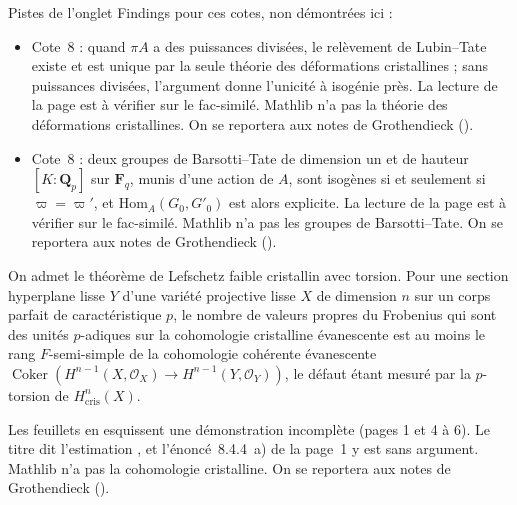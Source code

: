 \noindent Pistes de l'onglet Findings pour ces cotes, non démontrées ici :
\begin{itemize}\small\setlength{\itemsep}{0pt}
\item Cote~8 : quand $\pi A$ a des puissances divisées, le relèvement de Lubin--Tate existe et est unique par la seule théorie des déformations cristallines ; sans puissances divisées, l'argument donne l'unicité à isogénie près. La lecture de la page est à vérifier sur le fac-similé. Mathlib n'a pas la théorie des déformations cristallines. On se reportera aux notes de Grothendieck ().
\item Cote~8 : deux groupes de Barsotti--Tate de dimension un et de hauteur $[K : \mathbf Q_p]$ sur $\mathbf F_q$, munis d'une action de $A$, sont isogènes si et seulement si $\varpi = \varpi'$, et $\mathrm{Hom}_A(G_0, G'_0)$ est alors explicite. La lecture de la page est à vérifier sur le fac-similé. Mathlib n'a pas les groupes de Barsotti--Tate. On se reportera aux notes de Grothendieck ().
\end{itemize}

\begin{encadre}
\begin{theoreme*}\nonverifie
On admet le théorème de Lefschetz faible cristallin avec torsion. Pour une section hyperplane lisse $Y$ d'une variété projective lisse $X$ de dimension $n$ sur un corps parfait de caractéristique $p$, le nombre de valeurs propres du Frobenius qui sont des unités $p$-adiques sur la cohomologie cristalline évanescente est au moins le rang $F$-semi-simple de la cohomologie cohérente évanescente $\operatorname{Coker}(H^{n-1}(X, \mathcal O_X) \to H^{n-1}(Y, \mathcal O_Y))$, le défaut étant mesuré par la $p$-torsion de $H^n_{\mathrm{cris}}(X)$.
\end{theoreme*}
\end{encadre}
{\small Les feuillets en esquissent une démonstration incomplète (pages 1 et 4 à 6). Le titre dit l'estimation , et l'énoncé~8.4.4~a) de la page~1 y est sans argument. Mathlib n'a pas la cohomologie cristalline. On se reportera aux notes de Grothendieck ().\par}

